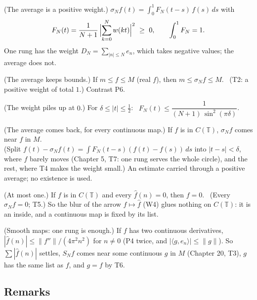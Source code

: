 \begin{lines}
\item[\lab{T2}] (The average is a positive weight.) $\sigma_N f(t) = \int_0^1 F_N(t - s)\, f(s)\, ds$ with \[ F_N(t) = \frac{1}{N+1}\,\Bigl|\sum_{k=0}^{N} w(k t)\Bigr|^2 \ \ge\ 0, \qquad \int_0^1 F_N = 1. \] One rung has the weight $D_N = \sum_{|n| \le N} e_n$, which takes negative values; the average does not.
\item[\lab{T3}] (The average keeps bounds.) If $m \le f \le M$ (real $f$), then $m \le \sigma_N f \le M$. \ (T2: a positive weight of total $1$.) Contrast P6.
\item[\lab{T4}] (The weight piles up at $0$.) For $\delta \le |t| \le \tfrac12$: \ $F_N(t) \le \dfrac{1}{(N+1)\, \sin^2(\pi \delta)}$.
\item[\lab{T5}] (The average comes back, for every continuous map.) If $f$ is in $C(\mathbb{T})$, $\sigma_N f$ comes near $f$ in $M$. \\
(Split $f(t) - \sigma_N f(t) = \int F_N(t - s)(f(t) - f(s))\,ds$ into $|t - s| < \delta$, where $f$ barely moves (Chapter 5, T7: one rung serves the whole circle), and the rest, where T4 makes the weight small.) An estimate carried through a positive average; no existence is used.
\item[\lab{T6}] (At most one.) If $f$ is in $C(\mathbb{T})$ and every $\widehat f(n) = 0$, then $f = 0$. \ (Every $\sigma_N f = 0$; T5.) So the blur of the arrow $f \mapsto \widehat f$ (W4) glues nothing on $C(\mathbb{T})$: it is an inside, and a continuous map is fixed by its list.
\item[\lab{T7}] (Smooth maps: one rung is enough.) If $f$ has two continuous derivatives, $|\widehat f(n)| \le \|f''\| / (4\pi^2 n^2)$ for $n \ne 0$ (P4 twice, and $|\langle g, e_n \rangle| \le \|g\|$). So $\sum |\widehat f(n)|$ settles, $S_N f$ comes near some continuous $g$ in $M$ (Chapter 20, T3), $g$ has the same list as $f$, and $g = f$ by T6.
\end{lines}

\subsection*{Remarks}

